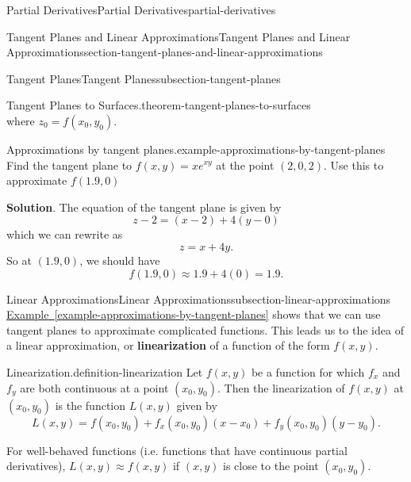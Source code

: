 \documentclass[oneside,10pt,]{book}
\newcommand{\terminology}[1]{\textbf{#1}}
\numberwithin{equation}{section}
\begin{document}
\begin{chapterptx}{Partial Derivatives}{}{Partial Derivatives}{}{}{partial-derivatives}
\begin{sectionptx}{Tangent Planes and Linear Approximations}{}{Tangent Planes and Linear Approximations}{}{}{section-tangent-planes-and-linear-approximations}
\begin{subsectionptx}{Tangent Planes}{}{Tangent Planes}{}{}{subsection-tangent-planes}
\begin{theorem}{Tangent Planes to Surfaces.}{}{theorem-tangent-planes-to-surfaces}
\begin{equation*}
\end{equation*}
where \(z_{0} = f(x_{0},y_{0})\).%
\end{theorem}
\begin{example}{Approximations by tangent planes.}{example-approximations-by-tangent-planes}%
\hypertarget{p-1376}{}%
Find the tangent plane to \(f(x,y) = xe^{xy}\) at the point \((2,0,2)\). Use this to approximate \(f(1.9,0)\)%
\par\smallskip%
\noindent\textbf{Solution}.\hypertarget{solution-221}{}\quad%
\hypertarget{p-1377}{}%
The equation of the tangent plane is given by%
\begin{equation*}
z - 2 = (x - 2) + 4(y - 0)
\end{equation*}
which we can rewrite as%
\begin{equation*}
z = x + 4y.
\end{equation*}
So at \((1.9,0)\), we should have%
\begin{equation*}
f(1.9,0)\approx 1.9 + 4(0) = 1.9.
\end{equation*}
%
\end{example}
\end{subsectionptx}
%
%
\typeout{************************************************}
\typeout{************************************************}
%
\begin{subsectionptx}{Linear Approximations}{}{Linear Approximations}{}{}{subsection-linear-approximations}
\hypertarget{p-1378}{}%
\hyperref[example-approximations-by-tangent-planes]{Example~\ref{example-approximations-by-tangent-planes}} shows that we can use tangent planes to approximate complicated functions. This leads us to the idea of a linear approximation, or \terminology{linearization} of a function of the form \(f(x,y)\).%
\begin{definition}{Linearization.}{definition-linearization}%
\hypertarget{p-1379}{}%
Let \(f(x,y)\) be a function for which \(f_{x}\) and \(f_{y}\) are both continuous at a point \((x_{0},y_{0})\). Then the linearization of \(f(x,y)\) at \((x_{0},y_{0})\) is the function \(L(x,y)\) given by%
\begin{equation*}
L(x,y) = f(x_{0},y_{0}) + f_{x}(x_{0},y_{0})(x-x_{0}) + f_{y}(x_{0},y_{0})(y-y_{0}).
\end{equation*}
%
\end{definition}
\hypertarget{p-1380}{}%
For well-behaved functions (i.e. functions that have continuous partial derivatives), \(L(x,y)\approx f(x,y)\) if \((x,y)\) is close to the point \((x_{0},y_{0})\).%

\end{subsectionptx}
\end{sectionptx}
\end{chapterptx}
\end{document}
